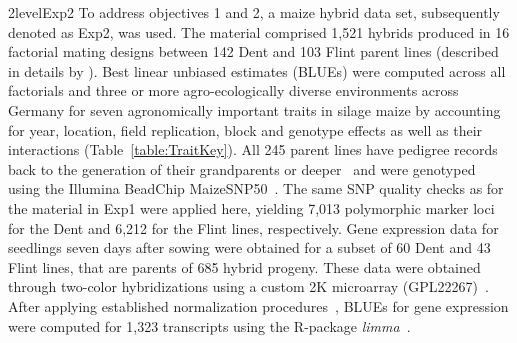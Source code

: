 \documentclass[12pt,titlepage]{article}
\begin{document}
\Genetics2level{Exp2}
To address objectives 1 and 2, a maize hybrid data set, subsequently
denoted as Exp2, was used.
The material comprised 1,521 hybrids produced in 16 factorial mating designs
between 142 Dent and 103 Flint parent lines (described in details by
).
Best linear unbiased estimates (BLUEs) were computed across all factorials and 
three or more agro-ecologically diverse environments across Germany for seven
agronomically important traits in silage maize by accounting for year, location,
field replication, block and genotype effects as well as their interactions
(Table~\ref{table:TraitKey}).
All 245 parent lines have pedigree records back to the generation of their 
grandparents or deeper~\cite{Westhues2017} and were genotyped using the Illumina 
BeadChip MaizeSNP50~\cite{Ganal2011}.
The same SNP quality checks as for the material in Exp1 were applied here,
yielding 7,013 polymorphic marker loci for the Dent and 6,212 for the Flint
lines, respectively.
Gene expression data for seedlings seven days after sowing were obtained for a 
subset of 60 Dent and 43 Flint lines, that are parents of 685 hybrid progeny.
These data were obtained through two-color hybridizations using a custom 2K 
microarray (GPL22267)~\cite{Westhues2017}.
After applying established normalization procedures~\cite{Smyth2003,Ritchie2007},
BLUEs for gene expression were computed for 1,323 transcripts
\cite{Westhues2017} using the R-package \emph{limma}~\cite{Ritchie2015a}.
\end{document}
